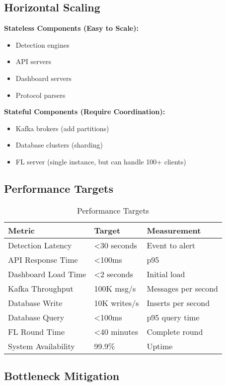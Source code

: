 \documentclass[12pt,a4paper]{article}
\begin{document}
\subsection{Horizontal Scaling}

\textbf{Stateless Components (Easy to Scale):}
\begin{itemize}[leftmargin=1cm,itemsep=0pt]
    \item Detection engines
    \item API servers
    \item Dashboard servers
    \item Protocol parsers
\end{itemize}

\textbf{Stateful Components (Require Coordination):}
\begin{itemize}[leftmargin=1cm,itemsep=0pt]
    \item Kafka brokers (add partitions)
    \item Database clusters (sharding)
    \item FL server (single instance, but can handle 100+ clients)
\end{itemize}

\subsection{Performance Targets}

\begin{table}[H]
\centering
\small
\begin{tabular}{|l|l|l|}
\hline
\textbf{Metric} & \textbf{Target} & \textbf{Measurement} \\
\hline
Detection Latency & <30 seconds & Event to alert \\
API Response Time & <100ms & p95 \\
Dashboard Load Time & <2 seconds & Initial load \\
Kafka Throughput & 100K msg/s & Messages per second \\
Database Write & 10K writes/s & Inserts per second \\
Database Query & <100ms & p95 query time \\
FL Round Time & <40 minutes & Complete round \\
System Availability & 99.9\% & Uptime \\
\hline
\end{tabular}
\caption{Performance Targets}
\end{table}

\subsection{Bottleneck Mitigation}
\end{document}
